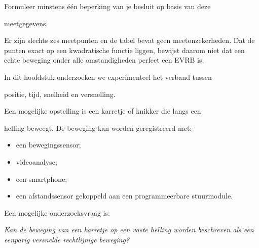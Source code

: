\documentclass{ximera}
\begin{document}
\begin{oefening}{\oefU\ESS}
\begin{question}

Formuleer minstens één beperking van je besluit op basis van deze

meetgegevens.

\begin{oplossing}
Er zijn slechts zes meetpunten en de tabel bevat geen meetonzekerheden. Dat de punten exact op een kwadratische functie liggen, bewijst daarom niet dat een echte beweging onder alle omstandigheden perfect een EVRB is.
\end{oplossing}

\end{question}

\end{oefening}





In dit hoofdstuk onderzoeken we experimenteel het verband tussen

positie, tijd, snelheid en versnelling.

Een mogelijke opstelling is een karretje of knikker die langs een

helling beweegt. De beweging kan worden geregistreerd met:

\begin{itemize}

 \item een bewegingssensor;

 \item videoanalyse;

 \item een smartphone;

 \item een afstandssensor gekoppeld aan een programmeerbare stuurmodule.

\end{itemize}


Een mogelijke onderzoeksvraag is:

\begin{center}

\textit{Kan de beweging van een karretje op een vaste helling worden beschreven als een eenparig versnelde rechtlijnige beweging?}

\end{center}
\end{document}
